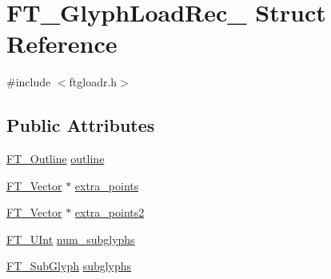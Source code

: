 \hypertarget{struct_f_t___glyph_load_rec__}{\section{F\-T\-\_\-\-Glyph\-Load\-Rec\-\_\- Struct Reference}
\label{struct_f_t___glyph_load_rec__}
}


{\ttfamily \#include $<$ftgloadr.\-h$>$}

\subsection*{Public Attributes}
\begin{DoxyCompactItemize}
\item 
\hyperlink{ftimage_8h_a79cb182373b5aa3041955b19ce32afca}{F\-T\-\_\-\-Outline} \hyperlink{struct_f_t___glyph_load_rec___ae340cdb5263322e86c640b15f82ea72a}{outline}
\item 
\hyperlink{ftimage_8h_ab158b5a7e422acb1968af95db786d018}{F\-T\-\_\-\-Vector} $\ast$ \hyperlink{struct_f_t___glyph_load_rec___ad2547bd6a7c7473d3a4646dfe908f1c3}{extra\-\_\-points}
\item 
\hyperlink{ftimage_8h_ab158b5a7e422acb1968af95db786d018}{F\-T\-\_\-\-Vector} $\ast$ \hyperlink{struct_f_t___glyph_load_rec___a5e8bbe62bd889e806700bc0d583ff79b}{extra\-\_\-points2}
\item 
\hyperlink{fttypes_8h_abcb8db4dbf35d2b55a9e8c7b0926dc52}{F\-T\-\_\-\-U\-Int} \hyperlink{struct_f_t___glyph_load_rec___a71dc4ab52b956b974fe65c95a098e03c}{num\-\_\-subglyphs}
\item 
\hyperlink{freetype_8h_a0d03ab6cac878c81dca92e6a8c87a3a1}{F\-T\-\_\-\-Sub\-Glyph} \hyperlink{struct_f_t___glyph_load_rec___a12ef145fedbeb14cc8b9d320ae3fed96}{subglyphs}
\end{DoxyCompactItemize}


